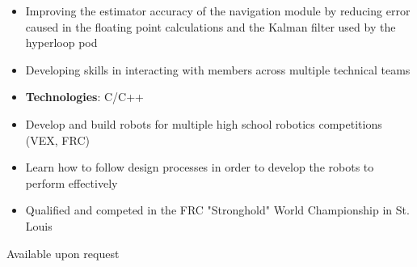 \documentclass[10pt, letterpaper, ragged2e, withhyper]{altacv}
\begin{document}
\begin{paracol}{2}
    \divider
    
    \begin{itemize}
        \item Improving the estimator accuracy of the navigation module by reducing error caused in the floating point
        calculations and the Kalman filter used by the hyperloop pod
        \item Developing skills in interacting with members across multiple technical teams
        \item \textbf{Technologies}: C/C++
    \end{itemize}

    \divider

    \begin{itemize}
        \item Develop and build robots for multiple high school robotics competitions (VEX, FRC)
        \item Learn how to follow design processes in order to develop the robots to perform effectively
        \item Qualified and competed in the FRC "Stronghold" World Championship in St. Louis 
    \end{itemize}

    Available upon request

\end{paracol}
\end{document}
